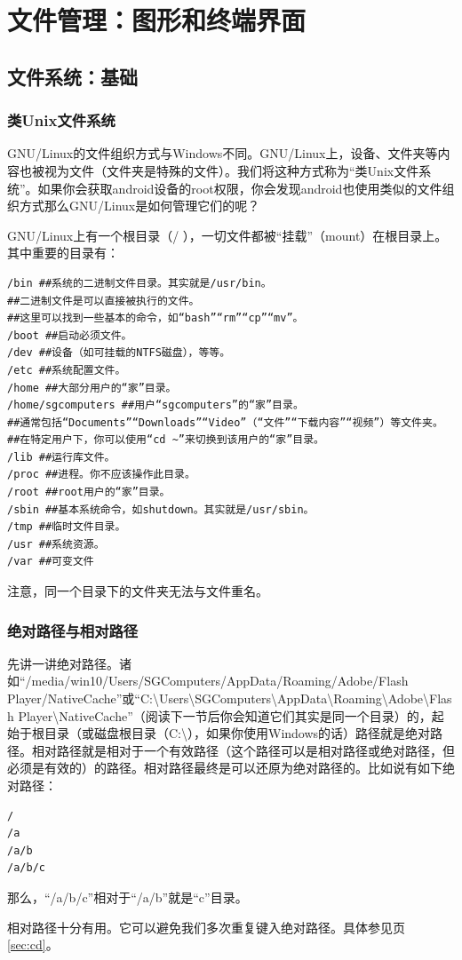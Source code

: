 \section{文件管理：图形和终端界面}
\subsection{文件系统：基础}
\subsubsection{类Unix文件系统}
GNU/Linux的文件组织方式与Windows不同。GNU/Linux上，设备、文件夹等内容也被视为文件（文件夹是特殊的文件）。我们将这种方式称为“类Unix文件系统”。如果你会获取android设备的root权限，你会发现android也使用类似的文件组织方式那么GNU/Linux是如何管理它们的呢？\par
GNU/Linux上有一个根目录（/ ），一切文件都被“挂载”（mount）在根目录上。其中重要的目录有：
\begin{verbatim}
/bin ##系统的二进制文件目录。其实就是/usr/bin。
##二进制文件是可以直接被执行的文件。
##这里可以找到一些基本的命令，如“bash”“rm”“cp”“mv”。
/boot ##启动必须文件。
/dev ##设备（如可挂载的NTFS磁盘），等等。
/etc ##系统配置文件。
/home ##大部分用户的“家”目录。
/home/sgcomputers ##用户“sgcomputers”的“家”目录。
##通常包括“Documents”“Downloads”“Video”（“文件”“下载内容”“视频”）等文件夹。
##在特定用户下，你可以使用“cd ~”来切换到该用户的“家”目录。
/lib ##运行库文件。
/proc ##进程。你不应该操作此目录。
/root ##root用户的“家”目录。
/sbin ##基本系统命令，如shutdown。其实就是/usr/sbin。
/tmp ##临时文件目录。
/usr ##系统资源。
/var ##可变文件
\end{verbatim} \par
注意，同一个目录下的文件夹无法与文件重名。
\subsubsection{绝对路径与相对路径}
\label{sec:path}先讲一讲绝对路径。诸如“/media/win10/Users/SGComputers/AppData/Roaming/Adobe/Flash Player/NativeCache”或“C:\textbackslash Users\textbackslash SGComputers\textbackslash AppData\textbackslash Roaming\textbackslash Adobe\textbackslash Flash Player\textbackslash NativeCache”（阅读下一节后你会知道它们其实是同一个目录）的，起始于根目录（或磁盘根目录（C:\textbackslash），如果你使用Windows的话）路径就是绝对路径。相对路径就是相对于一个有效路径（这个路径可以是相对路径或绝对路径，但必须是有效的）的路径。相对路径最终是可以还原为绝对路径的。比如说有如下绝对路径：
\begin{verbatim}
/
/a
/a/b
/a/b/c
\end{verbatim} \par
那么，“/a/b/c”相对于“/a/b”就是“c”目录。\par
相对路径十分有用。它可以避免我们多次重复键入绝对路径。具体参见\pageref{sec:cd}页\ref{sec:cd}。
